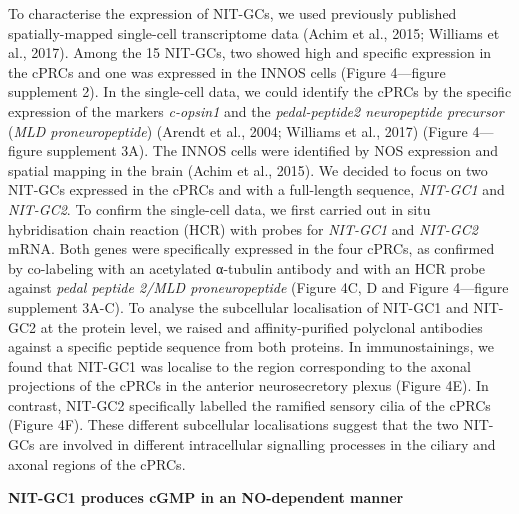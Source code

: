\documentclass[
  10pt,
  onecolumn]{article}
\begin{document}
To characterise the expression of NIT-GCs, we used previously published
spatially-mapped single-cell transcriptome data (Achim et al., 2015;
Williams et al., 2017). Among the 15 NIT-GCs, two showed high and
specific expression in the cPRCs and one was expressed in the INNOS
cells (Figure 4---figure supplement 2). In the single-cell data, we
could identify the cPRCs by the specific expression of the markers
\emph{c-opsin1} and the \emph{pedal-peptide2 neuropeptide precursor}
(\emph{MLD proneuropeptide}) (Arendt et al., 2004; Williams et al.,
2017) (Figure 4---figure supplement 3A). The INNOS cells were identified
by NOS expression and spatial mapping in the brain (Achim et al., 2015).
We decided to focus on two NIT-GCs expressed in the cPRCs and with a
full-length sequence, \emph{NIT-GC1} and \emph{NIT-GC2}. To confirm the
single-cell data, we first carried out in situ hybridisation chain
reaction (HCR) with probes for \emph{NIT-GC1} and \emph{NIT-GC2} mRNA.
Both genes were specifically expressed in the four cPRCs, as confirmed
by co-labeling with an acetylated α-tubulin antibody and with an HCR
probe against \emph{pedal peptide 2/MLD proneuropeptide} (Figure 4C, D
and Figure 4---figure supplement 3A-C). To analyse the subcellular
localisation of NIT-GC1 and NIT-GC2 at the protein level, we raised and
affinity-purified polyclonal antibodies against a specific peptide
sequence from both proteins. In immunostainings, we found that NIT-GC1
was localise to the region corresponding to the axonal projections of
the cPRCs in the anterior neurosecretory plexus (Figure 4E). In
contrast, NIT-GC2 specifically labelled the ramified sensory cilia of
the cPRCs (Figure 4F). These different subcellular localisations suggest
that the two NIT-GCs are involved in different intracellular signalling
processes in the ciliary and axonal regions of the cPRCs.

\textbf{NIT-GC1 produces cGMP in an NO-dependent manner}
\end{document}
